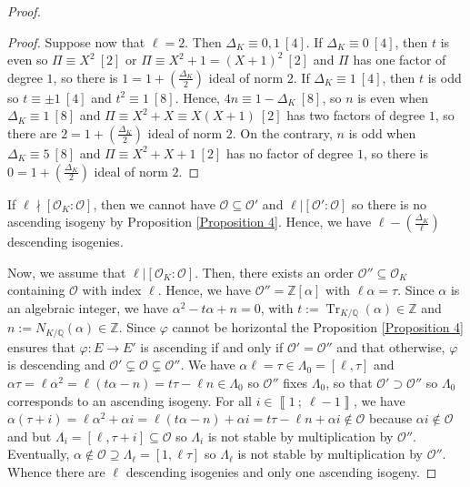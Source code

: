 \documentclass[a4paper,10pt]{report}
\theoremstyle{definition}
\theoremstyle{plain}
\theoremstyle{definition}
\newcommand{\Z}{\mathbb{Z}}
\newcommand{\Q}{\mathbb{Q}}
\newcommand{\mO}{\mathcal{O}}
\renewcommand{\i}[2]{\left\llbracket #1~;~#2\right\rrbracket}
\renewcommand{\(}{\left(}
\renewcommand{\)}{\right)}
\DeclareMathOperator{\Tr}{Tr}
\begin{document}
\begin{proof}
\begin{proof}
Suppose now that $\ell=2$. Then $\Delta_K\equiv 0, 1 \ [4]$. If $\Delta_K\equiv 0 \ [4]$, then $t$ is even so $\Pi\equiv X^2 \ [2]$ or $\Pi\equiv X^2+1=(X+1)^2 \ [2]$ and $\Pi$ has one factor of degree $1$, so there is $1=1+\(\frac{\Delta_K}{2}\)$ ideal of norm $2$. If $\Delta_K\equiv 1 \ [4]$, then $t$ is odd so $t\equiv \pm 1 \ [4]$ and $t^2\equiv 1 \ [8]$. Hence, $4n\equiv 1-\Delta_K \ [8]$, so $n$ is even when $\Delta_K\equiv 1 \ [8]$ and $\Pi\equiv X^2+X\equiv X(X+1) \ [2]$ has two factors of degree $1$, so there are $2=1+\(\frac{\Delta_K}{2}\)$ ideal of norm $2$.  On the contrary, $n$ is odd when $\Delta_K\equiv 5 \ [8]$ and $\Pi\equiv X^2+X+1\ [2]$ has no factor of degree $1$, so there is $0=1+\(\frac{\Delta_K}{2}\)$ ideal of norm $2$.
\end{proof}

If $\ell\nmid [\mO_K:\mO]$, then we cannot have $\mO\subseteq\mO'$ and $\ell|[\mO':\mO]$ so there is no ascending isogeny by Proposition \ref{Proposition 4}. Hence, we have $\ell-\(\frac{\Delta_K}{\ell}\)$ descending isogenies.

Now, we assume that $\ell|[\mO_K:\mO]$. Then, there exists an order $\mO''\subseteq \mO_K$ containing $\mO$ with index $\ell$. Hence, we have $\mO''=\Z[\alpha]$ with $\ell\alpha=\tau$.  Since $\alpha$ is an algebraic integer, we have $\alpha^2-t\alpha+n=0$, with $t:=\Tr_{K/\Q}(\alpha)\in \Z$ and $n:=N_{K/\Q}(\alpha)\in \Z$. Since $\varphi$ cannot be horizontal the Proposition \ref{Proposition 4} ensures that $\varphi:E\longrightarrow E'$ is ascending if and only if $\mO'=\mO''$ and that otherwise, $\varphi$ is descending and $\mO'\subsetneq \mO\subsetneq \mO''$.  We have $\alpha\ell=\tau\in\Lambda_0=[\ell,\tau]$ and $\alpha\tau=\ell\alpha^2=\ell(t\alpha-n)=t\tau-\ell n\in \Lambda_0$ so $\mO''$ fixes $\Lambda_0$, so that $\mO'\supset\mO''$ so $\Lambda_0$ corresponds to an ascending isogeny.  For all $i\in\i{1}{\ell-1}$, we have $\alpha(\tau+i)=\ell\alpha^2+\alpha i=\ell(t\alpha-n)+\alpha i=t\tau-\ell n+\alpha i\not\in\mO$ because $\alpha i\not\in\mO$ and but $\Lambda_i=[\ell,\tau+i]\subseteq\mO$ so $\Lambda_i$ is not stable by multiplication by $\mO''$.  Eventually,  $\alpha\not\in \mO\supseteq \Lambda_\ell=[1,\ell\tau]$ so $\Lambda_\ell$ is not stable by multiplication by $\mO''$. Whence there are $\ell$ descending isogenies and only one ascending isogeny.


\end{proof}
\end{document}
